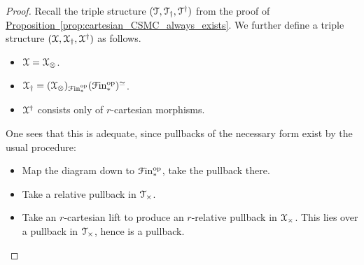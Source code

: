 \documentclass[main.tex]{subfiles}
\begin{document}
\begin{proof}
  Recall the triple structure $(\mathcal{T}, \mathcal{T}_{\dagger}, \mathcal{T}^{\dagger})$ from the proof of \hyperref[prop:cartesian_CSMC_always_exists]{Proposition~\ref*{prop:cartesian_CSMC_always_exists}}. We further define a triple structure $(\mathcal{X}, \mathcal{X}_{\dagger}, \mathcal{X}^{\dagger})$ as follows.
  \begin{itemize}
    \item $\mathcal{X} = \mathcal{X}_{\otimes}$.

    \item $\mathcal{X}_{\dagger} = (\mathcal{X}_{\otimes})_{\mathcal{F}\mathrm{in}_{*}^{\mathrm{op}}}(\mathcal{F}\mathrm{in}_{*}^{\mathrm{op}})^{\simeq}$.

    \item $\mathcal{X}^{\dagger}$ consists only of $r$-cartesian morphisms.
  \end{itemize}

  One sees that this is adequate, since pullbacks of the necessary form exist by the usual procedure:
  \begin{itemize}
    \item Map the diagram down to $\mathcal{F}\mathrm{in}_{*}^{\mathrm{op}}$, take the pullback there.

    \item Take a relative pullback in $\mathcal{T}_{\times}$.

    \item Take an $r$-cartesian lift to produce an $r$-relative pullback in $\mathcal{X}_{\times}$. This lies over a pullback in $\mathcal{T}_{\times}$, hence is a pullback.
  \end{itemize}


\end{proof}
\end{document}
